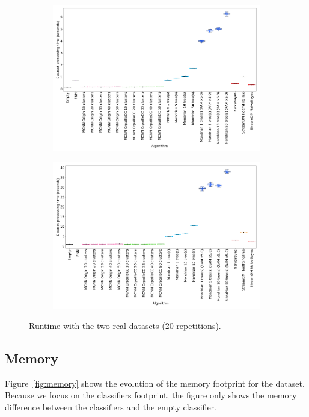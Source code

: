 \begin{figure}
	\begin{subfigure}[t]{.49\linewidth}
		\includegraphics[width=\linewidth]{figures/results/banos_6_runtime.png}
		\caption{\banosdataset}
		\label{fig:runtime-banos}
	\end{subfigure}
	\hfill
	\begin{subfigure}[t]{.49\linewidth}
		\includegraphics[width=\linewidth]{figures/results/recofit_6_runtime.png}
		\caption{\recofitdataset}
		\label{fig:runtime-recofit}
	\end{subfigure}
	\caption{Runtime with the two real datasets (20 repetitions).}
	\label{fig:runtime}
\end{figure}

\subsection{Memory}
\label{sec:result-memory}
Figure~\ref{fig:memory} shows the evolution of the memory footprint for the
\banosdataset dataset. Because we focus on the classifiers footprint, the
figure only shows the memory difference between the classifiers and the empty
classifier. 

